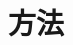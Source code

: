 \documentclass[12pt, a4j, dvipdfmx]{jarticle}
\begin{document}
\section{\large 方法}
\par
\end{document}
